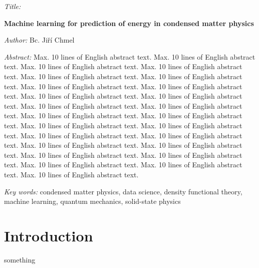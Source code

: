 \documentclass[11pt,oneside,czech,american]{book} %
\theoremstyle{plain}
\theoremstyle{definition}
\begin{document}
\begin{onehalfspace}
	\noindent \emph{Title:}
	
	\noindent \textbf{Machine learning for prediction of energy in condensed matter physics}
\end{onehalfspace}

\bigskip{}

\noindent \emph{Author:} Bc. Jiří Chmel

\bigskip{}

\noindent \emph{Abstract:} Max. 10 lines of English abstract text.
Max. 10 lines of English abstract text. Max. 10 lines of English abstract
text. Max. 10 lines of English abstract text. Max. 10 lines of English
abstract text. Max. 10 lines of English abstract text. Max. 10 lines
of English abstract text. Max. 10 lines of English abstract text.
Max. 10 lines of English abstract text. Max. 10 lines of English abstract
text. Max. 10 lines of English abstract text. Max. 10 lines of English
abstract text. Max. 10 lines of English abstract text. Max. 10 lines
of English abstract text. Max. 10 lines of English abstract text.
Max. 10 lines of English abstract text. Max. 10 lines of English abstract
text. Max. 10 lines of English abstract text. Max. 10 lines of English
abstract text. Max. 10 lines of English abstract text. Max. 10 lines
of English abstract text. Max. 10 lines of English abstract text.
Max. 10 lines of English abstract text. Max. 10 lines of English abstract
text. Max. 10 lines of English abstract text.

\bigskip{}

\noindent \emph{Key words:} condensed matter physics, data science, density functional theory, machine learning, quantum mechanics, solid-state physics

\newpage{}

\pagestyle{plain}

\tableofcontents{}

\newpage{}

\chapter*{Introduction}


something
\end{document}
